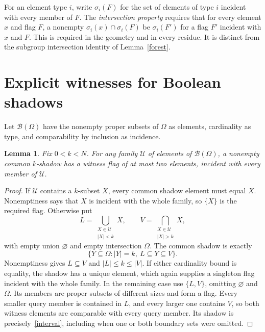 \documentclass[11pt,a4paper]{article}
\newtheorem{lemma}[theorem]{Lemma}
\begin{document}
For an element type $i$, write $\sigma_i(F)$ for the set of elements of
type $i$ incident with every member of $F$. The \emph{intersection
property} requires that for every element $x$ and flag $F$, a nonempty
$\sigma_i(x)\cap\sigma_i(F)$ be $\sigma_i(F')$ for a flag $F'$ incident
with $x$ and $F$. This is required in the geometry and in every residue.
It is distinct from the subgroup intersection identity of Lemma~\ref{forest}.

\section{Explicit witnesses for Boolean shadows}
Let $\mathcal B(\Omega)$ have the nonempty proper subsets of $\Omega$ as
elements, cardinality as type, and comparability by inclusion as incidence.

\begin{lemma}\label{boolean}
Fix $0<k<N$. For any family $\mathcal U$ of elements of
$\mathcal B(\Omega)$, a nonempty common $k$-shadow has a witness flag of
at most two elements, incident with every member of $\mathcal U$.
\end{lemma}
\begin{proof}
If $\mathcal U$ contains a $k$-subset $X$, every common shadow element
must equal $X$. Nonemptiness says that $X$ is incident with the whole
family, so $\{X\}$ is the required flag. Otherwise put
\[
 L=\bigcup_{\substack{X\in\mathcal U\\|X|<k}}X,
 \qquad V=\bigcap_{\substack{X\in\mathcal U\\|X|>k}}X,
\]
with empty union $\varnothing$ and empty intersection $\Omega$.
The common shadow is exactly
\begin{equation}\label{interval}
 \{Y\subseteq\Omega: |Y|=k,\ L\subseteq Y\subseteq V\}.
\end{equation}
Nonemptiness gives $L\subseteq V$ and $|L|\leq k\leq|V|$.
If either cardinality bound is equality, the shadow has a unique element,
which again supplies a singleton flag incident with the whole family.
In the remaining case use $\{L,V\}$, omitting $\varnothing$ and
$\Omega$. Its members are proper subsets of different sizes and form
a flag. Every smaller query member is contained in $L$, and every
larger one contains $V$, so both witness elements are comparable with
every query member. Its shadow is precisely~\eqref{interval}, including
when one or both boundary sets were omitted.
\end{proof}
\end{document}
